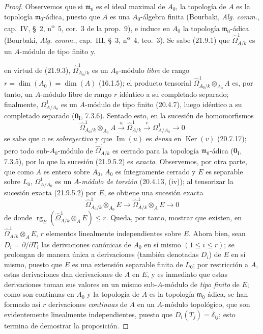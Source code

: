 \begin{proof}
Observemos que si $\mathfrak m_0$ es el ideal maximal de $A_0$, la topología
de $A$ es la topología $\mathfrak m_0$-ádica, puesto que $A$ es una
$A_0$-álgebra finita (Bourbaki, \emph{Alg. comm.}, cap.~IV, \S~2,
n\textsuperscript{o}~5, cor.~3 de la prop.~9), e induce en $A_0$ la topología
$\mathfrak m_0$-ádica (Bourbaki, \emph{Alg. comm.}, cap.~III, \S~3,
n\textsuperscript{o}~4, teo.~3). Se sabe (21.9.1) que
$\widehat\Omega^1_{A/k}$ es un $A$-módulo de tipo finito y,

en virtud de (21.9.3), $\widehat\Omega^1_{A_0/k}$ es un $A_0$-módulo \emph{libre} de
rango $r=\dim(A_0)=\dim(A)$ (16.1.5); el producto tensorial
$\widehat\Omega^1_{A_0/k}\otimes_{A_0}A$ es, por tanto, un $A$-módulo libre de
rango $r$ idéntico a su completado separado; finalmente,
$\Omega^1_{A/A_0}$ es un $A$-módulo de tipo finito (20.4.7), luego
idéntico a su completado separado ($\mathbf 0_{\mathrm I}$, 7.3.6). Sentado
esto, en la sucesión de homomorfismos
\begin{equation}
\tag{21.9.5.2}
\label{0.21.9.5.2-fr}
  \widehat\Omega^1_{A_0/k}\otimes_{A_0}A
  \xrightarrow{u}\widehat\Omega^1_{A/k}
  \xrightarrow{v}\Omega^1_{A/A_0}\longrightarrow0
\end{equation}
se sabe que $v$ es \emph{sobreyectivo} y que $\operatorname{Im}(u)$ es \emph{densa} en
$\operatorname{Ker}(v)$ (20.7.17); pero todo sub-$A_0$-módulo de
$\widehat\Omega^1_{A/k}$ es cerrado para la topología $\mathfrak m_0$-ádica
($\mathbf 0_{\mathrm I}$, 7.3.5), por lo que la sucesión (21.9.5.2) es \emph{exacta}.
Observemos, por otra parte, que como $A$ es entero sobre $A_0$, $A_0$ es
íntegramente cerrado y $E$ es separable sobre $L_0$,
$\Omega^1_{A/A_0}$ es un $A$-\emph{módulo de torsión} (20.4.13, (iv)); al
tensorizar la sucesión exacta (21.9.5.2) por $E$, se obtiene una sucesión
exacta
\[
  \widehat\Omega^1_{A_0/k}\otimes_{A_0}E
  \longrightarrow \widehat\Omega^1_{A/k}\otimes_AE\longrightarrow0
\]
de donde $\operatorname{rg}_E(\widehat\Omega^1_{A/k}\otimes_AE)\leqslant r$.
Queda, por tanto, mostrar que existen, en
$\widehat\Omega^1_{A/k}\otimes_AE$, $r$ elementos linealmente independientes
sobre $E$. Ahora bien, sean $D_i=\partial/\partial T_i$ las derivaciones
canónicas de $A_0$ en sí mismo $(1\leqslant i\leqslant r)$; se prolongan de
manera única a derivaciones (también denotadas $D_i$) de $E$ en sí mismo,
puesto que $E$ es una extensión separable finita de $L_0$; por restricción a
$A$, estas derivaciones dan derivaciones de $A$ en $E$, y es inmediato que
estas derivaciones toman sus valores en un mismo sub-$A$-módulo de \emph{tipo finito}
de $E$; como son continuas en $A_0$ y la topología de $A$ es la topología
$\mathfrak m_0$-ádica, se han formado así $r$ derivaciones \emph{continuas} de $A$
en un $A$-módulo topológico, que son evidentemente linealmente independientes,
puesto que $D_i(T_j)=\delta_{ij}$; esto termina de demostrar la proposición.
\end{proof}

